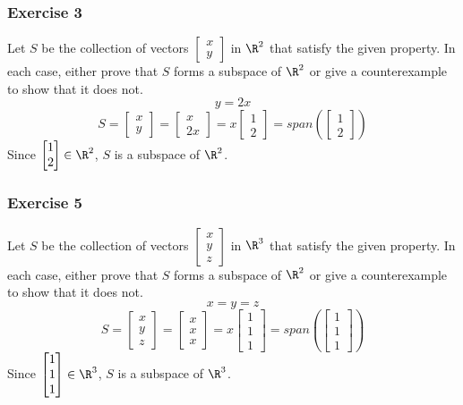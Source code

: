 \documentclass[letterpaper, 12pt]{math}
\begin{document}
\subsubsection*{Exercise 3}
Let \( S \) be the collection of vectors \( \begin{bmatrix}x \\ y\end{bmatrix}
\) in \( \R^2 \) that satisfy the given property. In each case, either prove
that \( S \) forms a subspace of \( \R^2 \) or give a counterexample to show
that it does not.
\[ y = 2x \]
\[ S = \begin{bmatrix}x \\ y\end{bmatrix} =
  \begin{bmatrix}x \\ 2x\end{bmatrix} =
  x\begin{bmatrix}1 \\ 2\end{bmatrix} =
  span\left(\begin{bmatrix}1 \\ 2\end{bmatrix}\right) \]
Since \( \begin{bmatrix}1 \\ 2\end{bmatrix}\in\R^2 \), \( S \) is a subspace of
\( \R^2 \).

\subsubsection*{Exercise 5}
Let \( S \) be the collection of vectors \( \begin{bmatrix}x \\ y \\ z
\end{bmatrix} \) in \( \R^3 \) that satisfy the given property. In each case,
either prove that \( S \) forms a subspace of \( \R^2 \) or give a
counterexample to show that it does not.
\[ x = y = z \]
\[ S = \begin{bmatrix}x \\ y \\ z\end{bmatrix} =
  \begin{bmatrix}x \\ x \\ x\end{bmatrix} =
  x\begin{bmatrix}1 \\ 1 \\ 1\end{bmatrix} =
  span\left(\begin{bmatrix}1 \\ 1 \\ 1\end{bmatrix}\right) \]
Since \( \begin{bmatrix}1 \\ 1 \\ 1\end{bmatrix}\in\R^3 \), \( S \) is a
subspace of \( \R^3 \).
\end{document}
